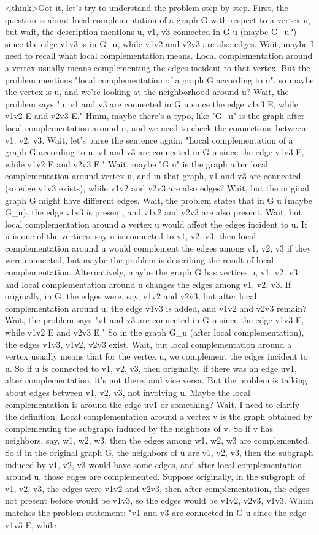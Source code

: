 <think>Got it, let's try to understand the problem step by step. First, the question is about local complementation of a graph G with respect to a vertex u, but wait, the description mentions u, v1, v3 connected in G u (maybe G_u?) since the edge v1v3 is in G_u, while v1v2 and v2v3 are also edges. Wait, maybe I need to recall what local complementation means. Local complementation around a vertex usually means complementing the edges incident to that vertex. But the problem mentions "local complementation of a graph G according to u", so maybe the vertex is u, and we're looking at the neighborhood around u? Wait, the problem says "u, v1 and v3 are connected in G u since the edge v1v3 E, while v1v2 E and v2v3 E." Hmm, maybe there's a typo, like "G_u" is the graph after local complementation around u, and we need to check the connections between v1, v2, v3. Wait, let's parse the sentence again: "Local complementation of a graph G according to u. v1 and v3 are connected in G u since the edge v1v3 E, while v1v2 E and v2v3 E." Wait, maybe "G u" is the graph after local complementation around vertex u, and in that graph, v1 and v3 are connected (so edge v1v3 exists), while v1v2 and v2v3 are also edges? Wait, but the original graph G might have different edges. Wait, the problem states that in G u (maybe G_u), the edge v1v3 is present, and v1v2 and v2v3 are also present. Wait, but local complementation around a vertex u would affect the edges incident to u. If u is one of the vertices, say u is connected to v1, v2, v3, then local complementation around u would complement the edges among v1, v2, v3 if they were connected, but maybe the problem is describing the result of local complementation. Alternatively, maybe the graph G has vertices u, v1, v2, v3, and local complementation around u changes the edges among v1, v2, v3. If originally, in G, the edges were, say, v1v2 and v2v3, but after local complementation around u, the edge v1v3 is added, and v1v2 and v2v3 remain? Wait, the problem says "v1 and v3 are connected in G u since the edge v1v3 E, while v1v2 E and v2v3 E." So in the graph G_u (after local complementation), the edges v1v3, v1v2, v2v3 exist. Wait, but local complementation around a vertex usually means that for the vertex u, we complement the edges incident to u. So if u is connected to v1, v2, v3, then originally, if there was an edge uv1, after complementation, it's not there, and vice versa. But the problem is talking about edges between v1, v2, v3, not involving u. Maybe the local complementation is around the edge uv1 or something? Wait, I need to clarify the definition. Local complementation around a vertex v is the graph obtained by complementing the subgraph induced by the neighbors of v. So if v has neighbors, say, w1, w2, w3, then the edges among w1, w2, w3 are complemented. So if in the original graph G, the neighbors of u are v1, v2, v3, then the subgraph induced by v1, v2, v3 would have some edges, and after local complementation around u, those edges are complemented. Suppose originally, in the subgraph of v1, v2, v3, the edges were v1v2 and v2v3, then after complementation, the edges not present before would be v1v3, so the edges would be v1v2, v2v3, v1v3. Which matches the problem statement: "v1 and v3 are connected in G u since the edge v1v3 E, while 